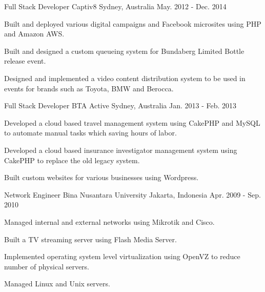 \begin{cventries}
  \cventry
    {Full Stack Developer} %
    {Captiv8} %
    {Sydney, Australia} %
    {May. 2012 - Dec. 2014} %
    {
      \begin{cvitems} %
        \item {Built and deployed various digital campaigns and Facebook microsites using PHP and Amazon AWS.}
        \item {Built and designed a custom queueing system for Bundaberg Limited Bottle release event.}
        \item {Designed and implemented a video content distribution system to be used in events for brands such as Toyota, BMW and Berocca.}
      \end{cvitems}
    }

  \cventry
    {Full Stack Developer} %
    {BTA Active} %
    {Sydney, Australia} %
    {Jan. 2013 - Feb. 2013} %
    {
      \begin{cvitems} %
        \item {Developed a cloud based travel management system using CakePHP and MySQL to automate manual tasks which saving hours of labor.}
        \item {Developed a cloud based insurance investigator management system using CakePHP to replace the old legacy system.}
        \item {Built custom websites for various businesses using Wordpress.}
      \end{cvitems}
    }

  \cventry
    {Network Engineer} %
    {Bina Nusantara University} %
    {Jakarta, Indonesia} %
    {Apr. 2009 - Sep. 2010} %
    {
      \begin{cvitems} %
        \item {Managed internal and external networks using Mikrotik and Cisco.}
        \item {Built a TV streaming server using Flash Media Server.}
        \item {Implemented operating system level virtualization using OpenVZ to reduce number of physical servers.}
        \item {Managed Linux and Unix servers.}
      \end{cvitems}
    }

\end{cventries}
